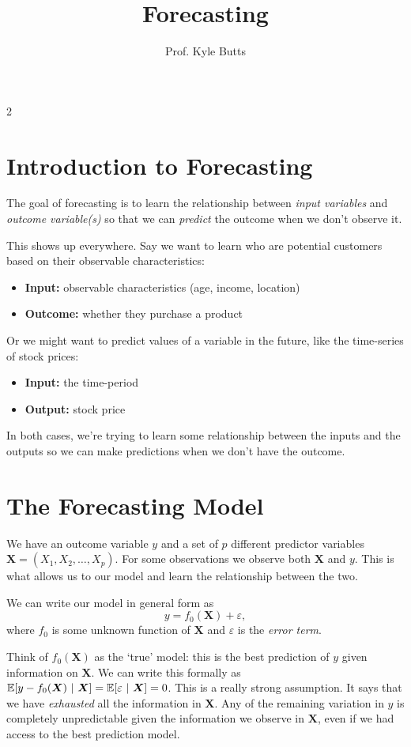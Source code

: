 \documentclass[12pt]{article}
\title{Forecasting}
\author{Prof. Kyle Butts}
\date{}
\begin{document}
\maketitle
\begin{multicols}{2}
  \section*{Introduction to Forecasting}

  The goal of forecasting is to learn the relationship between \emph{input variables} and \emph{outcome variable(s)} so that we can \emph{predict} the outcome when we don't observe it.

  This shows up everywhere. Say we want to learn who are potential customers based on their observable characteristics:
  \begin{itemize}
    \item[] \textbf{Input:} observable characteristics (age, income, location)
    \item[] \textbf{Outcome:} whether they purchase a product
  \end{itemize}

  Or we might want to predict values of a variable in the future, like the time-series of stock prices:
  \begin{itemize}
    \item[] \textbf{Input:} the time-period
    \item[] \textbf{Output:} stock price
  \end{itemize}

  In both cases, we're trying to learn some relationship between the inputs and the outputs so we can make predictions when we don't have the outcome.

  \section*{The Forecasting Model}

  We have an outcome variable $y$ and a set of $p$ different predictor variables $\bm{X} = (X_1, X_2, \dots, X_p)$.
  For some observations we observe both $\bm{X}$ and $y$.
  This is what allows us to  our model and learn the relationship between the two.

  We can write our model in general form as
  $$y = f_0(\bm{X}) + \varepsilon,$$
  where $f_0$ is some unknown function of $\bm{X}$ and $\varepsilon$ is the \emph{error term}.

  Think of $f_0(\bm{X})$ as the `true' model: this is the best prediction of $y$ given information on $\bm{X}$.
  We can write this formally as $\expec{y - f_0(\bm{X})}{\bm{X}} = \expec{\varepsilon}{\bm{X}} = 0$.
  This is a really strong assumption.
  It says that we have \emph{exhausted} all the information in $\bm{X}$.
  Any of the remaining variation in $y$ is completely unpredictable given the information we observe in $\bm{X}$, even if we had access to the best prediction model.


\end{multicols}
\end{document}
